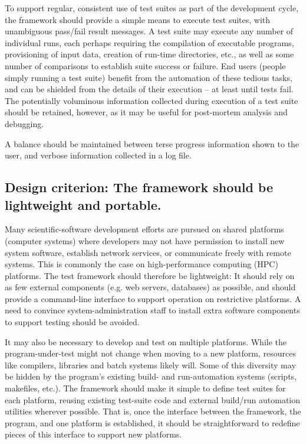 \documentclass[conference]{IEEEtran}
\begin{document}
To support regular, consistent use of test suites as part of the development cycle, the framework should provide a simple means to execute test suites, with unambiguous pass/fail result messages. A test suite may execute any number of individual runs, each perhaps requiring the compilation of executable programs, provisioning of input data, creation of run-time directories, etc., as well as some number of comparisons to establish suite success or failure. End users (people simply running a test suite) benefit from the automation of these tedious tasks, and can be shielded from the details of their execution -- at least until tests fail. The potentially voluminous information collected during execution of a test suite should be retained, however, as it may be useful for post-mortem analysis and debugging.

A balance should be maintained between terse progress information shown to the user, and verbose information collected in a log file.

\subsection{Design criterion: The framework should be lightweight and portable.}

Many scientific-software development efforts are pursued on shared platforms (computer systems) where developers may not have permission to install new system software, establish network services, or communicate freely with remote systems. This is commonly the case on high-performance computing (HPC) platforms. The test framework should therefore be lightweight: It should rely on as few external components (e.g. web servers, databases) as possible, and should provide a command-line interface to support operation on restrictive platforms. A need to convince system-administration staff to install extra software components to support testing should be avoided.

It may also be necessary to develop and test on multiple platforms. While the program-under-test might not change when moving to a new platform, resources like compilers, libraries and batch systems likely will. Some of this diversity may be hidden by the program's existing build- and run-automation systems (scripts, makefiles, etc.). The framework should make it simple to define test suites for each platform, reusing existing test-suite code and external build/run automation utilities wherever possible. That is, once the interface between the framework, the program, and one platform is established, it should be straightforward to redefine pieces of this interface to support new platforms.
\end{document}
